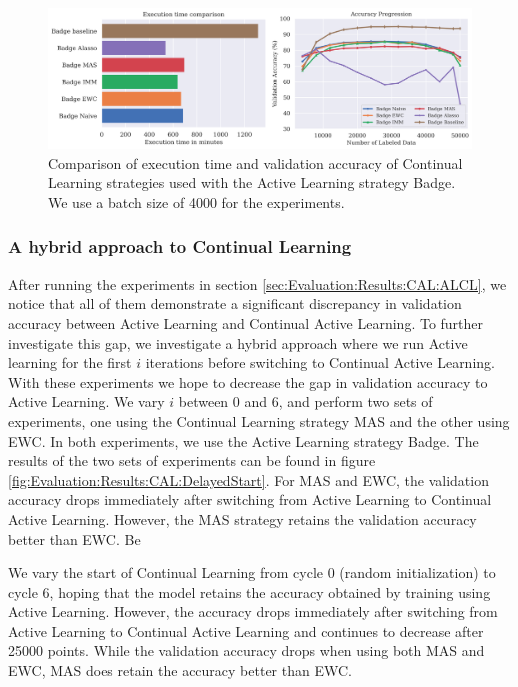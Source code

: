 \begin{figure}[h]
    \centering
    \includegraphics[width=\linewidth]{images/results_CAL/Badge_CAL_4000b.png}
    \caption[Continual Active Learning Badge 4000 batch size]{Comparison of execution time and validation accuracy of Continual Learning strategies used with the Active Learning strategy
    Badge. We use a batch size of 4000 for the experiments.}
    \label{fig:Evaluation:Results:CAL:Badge4000}
\end{figure}

\subsubsection{A hybrid approach to Continual Learning}
\label{sec:Evaluation:Results:CAL:Hybrid}
After running the experiments in section \ref{sec:Evaluation:Results:CAL:ALCL}, we notice that all of them demonstrate a significant discrepancy in validation accuracy between Active Learning and Continual Active Learning. To further investigate this gap,
we investigate a hybrid approach where we run Active learning for the first $i$ iterations before switching to Continual Active Learning. With these experiments we hope to decrease the gap in validation accuracy to Active Learning. We vary $i$ between 0 and 6,
and perform two sets of experiments, one using the Continual Learning strategy MAS and the other using EWC. In both experiments, we use the Active Learning strategy Badge. The results of the two sets of experiments can be found in figure 
\ref{fig:Evaluation:Results:CAL:DelayedStart}. For MAS and EWC, the validation accuracy drops immediately after switching from Active Learning to Continual Active Learning. However, the MAS strategy retains the validation accuracy better than EWC. 
Be


We vary the start of Continual Learning from 
    cycle 0 (random initialization) to cycle 6, hoping that the model retains the accuracy obtained by training using Active Learning. However, the accuracy drops immediately after switching
    from Active Learning to Continual Active Learning and continues to decrease after 25000 points. While the validation accuracy drops when using both MAS and EWC, MAS does retain the accuracy
    better than EWC.

